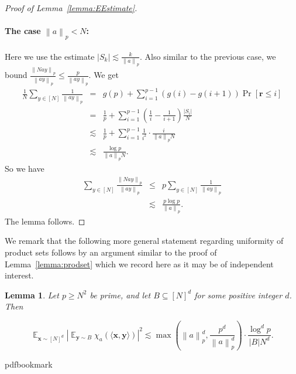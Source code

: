\documentclass[11pt]{article}
\numberwithin{equation}{section}
\newtheorem{lemma}[theorem]{Lemma}
\theoremstyle{definition}
\theoremstyle{plain}
\theoremstyle{definition}\newtheorem{problem}[theorem]{Problem}\theoremstyle{plain}
\DeclareMathOperator{\Ex}{{\mathbb E}}
\newcommand{\x}{\mathbf{x}}
\newcommand{\y}{\mathbf{y}}
\newcommand{\Br}{\mathbf{r}}   %
\newcommand{\ip}[1]{\langle #1 \rangle}
\newcommand{\norm}[1]{\left\| #1 \right\|_p}
\begin{document}
\begin{proof}[Proof of Lemma~\ref{lemma:EEstimate}]
\paragraph{The case $ \norm{a} < N$:}

Here we use the estimate $|S_k|\lesssim \frac{k}{\norm{a}}$. Also similar to the previous case, we bound $\frac{\norm{Nay}}{\norm{ay}}\leq \frac{p}{\norm{ay}}$.
We get
	\begin{eqnarray*}
\frac{1}{N}	\sum_{y \in [N]} \frac{1}{\norm{ay}}
		&=& g(p)+ \sum_{i=1}^{p-1} \left(g(i)-g(i+1)\right) \Pr[\Br  \leq i]\\
		&=& \frac{1}{p} + \sum_{i=1}^{p-1} \left(\frac{1}{i}-\frac{1}{i+1}\right) \frac{|S_i|}{N}\\
		&\lesssim& \frac{1}{p} + \sum_{i=1}^{p-1} \frac{1}{i^2} \cdot \frac{i}{\norm{a} N}\\
		&\lesssim&\frac{\log p}{\norm{a}N}.
  \end{eqnarray*}
  So we have
\begin{eqnarray*}
	\sum_{y \in [N]} \frac{\norm{Nay}}{\norm{ay}}
	&\leq& p\sum_{y \in [N]} \frac{1}{\norm{ay}}\\
	&\lesssim& \frac{p\log p}{\norm{a}}.
  \end{eqnarray*}
The lemma follows.
%
%
%
%
%
%
%
%
%
%
%
%
\end{proof}

We remark that the following more general statement regarding uniformity of product sets follows by %
an argument similar to the proof of %
%
%
%
Lemma~\ref{lemma:prodset} which we record here as it may be of independent interest.

\begin{lemma}\label{lemma:genprodset}
 Let $p \ge  N^2$ be prime, and  let $B \subseteq [N]^d$ for some positive integer $d$. Then
	
$$	 \Ex_{\x \sim [N]^d}  |\Ex_{\y \sim B} \chi_a(\ip{\x,\y })|^2  \lesssim \max\left(\norm{a}^d,\frac{p^d }{\norm{a}^d}\right) \cdot \frac{ \log^d p}{|B|N^d}.$$
\end{lemma}



\newcommand{\prelim}{Preliminary version in\ }\newcommand{\prelims}{Preliminary
  versions in\ }
\providecommand{\bibhead}[1]{}
\expandafter\ifx\csname pdfbookmark\endcsname\relax%
  \providecommand{\tocrefpdfbookmark}{}
\else\providecommand{\tocrefpdfbookmark}{%
   \hypertarget{tocreferences}{}%
   \pdfbookmark[1]{References}{tocreferences}}%
\fi
\end{document}

